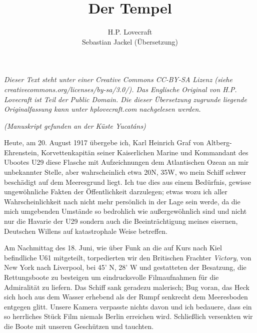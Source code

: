 \documentclass[a4paper]{memoir}
\begin{document}
\title{Der Tempel}
\author{H.P. Lovecraft\\
		Sebastian Jackel (Übersetzung)}
\date{}
\maketitle
\textit{Dieser Text steht unter einer Creative Commons CC-BY-SA Lizenz
(siehe\\ creativecommons.org/licenses/by-sa/3.0/). Das Englische Original von H.P. Lovecraft ist Teil der Public Domain. Die dieser Übersetzung zugrunde liegende Originalfassung kann unter hplovecraft.com nachgelesen werden.}

\vspace{12pt}

\begin{center}
\textit{(Manuskript gefunden an der Küste Yucatáns)}
\end{center}

Heute, am 20. August 1917 übergebe ich, Karl Heinrich Graf von Altberg-\-Ehren\-stein, Korvettenkapitän seiner Kaiserlichen Marine und Kommandant des Ubootes U29 diese Flasche mit Aufzeichnungen dem Atlantischen Ozean an mir unbekannter Stelle, aber wahrscheinlich etwa 20\textdegree N, 35\textdegree W, wo mein Schiff schwer beschädigt auf dem Meeresgrund liegt. Ich tue dies aus einem Bedürfnis, gewisse ungewöhnliche Fakten der Öffentlichkeit darzulegen; etwas wozu ich aller Wahrscheinlichkeit nach nicht mehr persönlich in der Lage sein werde, da die mich umgebenden Umstände so bedrohlich wie außergewöhnlich sind und nicht nur die Havarie der U29 sondern auch die Beeinträchtigung meines eisernen, Deutschen Willens auf katastrophale Weise betreffen.

Am Nachmittag des 18. Juni, wie über Funk an die auf Kurs nach Kiel befindliche U61 mitgeteilt, torpedierten wir den Britischen Frachter \textit{Victory}, von New York nach Liverpool, bei 45' N, 28' W und gestatteten der Besatzung, die Rettungsboote zu besteigen um eindrucksvolle Filmaufnahmen für die Admiralität zu liefern. Das Schiff sank geradezu malerisch; Bug voran, das Heck sich hoch aus dem Wasser erhebend als der Rumpf senkrecht dem Meeresboden entgegen glitt. Unsere Kamera verpasste nichts davon und ich bedauere, dass ein so herrliches Stück Film niemals Berlin erreichen wird. Schließlich versenkten wir die Boote mit unseren Geschützen und tauchten.
\end{document}
